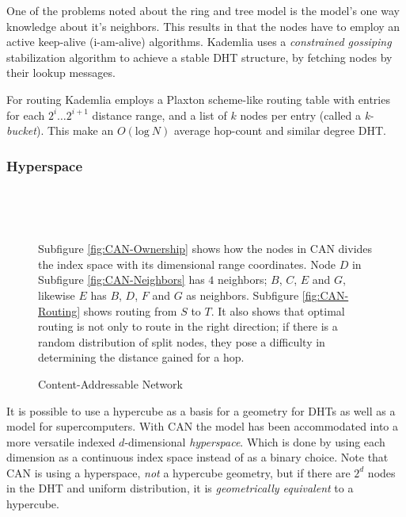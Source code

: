 One of the problems noted about the ring and tree model is the model's one way
 knowledge about it's neighbors. This results in that the nodes have to employ an
 active keep-alive (i-am-alive) algorithms\cite{zhuang-05-failure-detection}.
 Kademlia\cite{maymounkov-02-kademlia} uses a \emph{constrained gossiping} stabilization
 algorithm to achieve a stable DHT structure, by fetching nodes by their lookup
 messages.

For routing Kademlia employs a Plaxton scheme-like routing table with entries for each
 $2^i\ldots2^{i+1}$ distance range, and a list of $k$ nodes per entry (called a \emph{k-bucket}).
 This make an $O(\mathrm{log\ }N)$ average hop-count and similar degree DHT.

\subsubsection{Hyperspace}
\label{theory:Geometry:Hyperspace}

\begin{figure}[htp]
\centering
{}
\parbox{.05\linewidth}{\ }
\parbox{.05\linewidth}{\ }
\parbox{.9\linewidth}{\small
   Subfigure \ref{fig:CAN-Ownership} shows how the nodes in CAN divides the index
   space with its dimensional range coordinates. Node $D$ in Subfigure \ref{fig:CAN-Neighbors}
   has $4$ neighbors; $B$, $C$, $E$ and $G$, likewise $E$ has $B$, $D$, $F$ and $G$ as neighbors.
   Subfigure \ref{fig:CAN-Routing} shows routing from $S$ to $T$. It also shows that optimal
   routing is not only to route in the right direction; if there is a random
   distribution of split nodes, they pose a difficulty in determining the distance gained for a hop.
}
\caption{Content-Addressable Network}\label{fig:CAN}
\end{figure}

It is possible to use a hypercube as a basis for a geometry for DHTs as well as a
 model for supercomputers.
 With CAN\cite{ratnasamy-01-CAN} the model has been accommodated into a more versatile
 indexed $d$-dimensional \emph{hyperspace}. Which is done by using each dimension as
 a continuous index space instead of as a binary choice. Note that CAN is using a
 hyperspace, \emph{not} a hypercube geometry, but if there are $2^d$ nodes in the DHT and
 uniform distribution, it is \emph{geometrically equivalent} to a hypercube.

